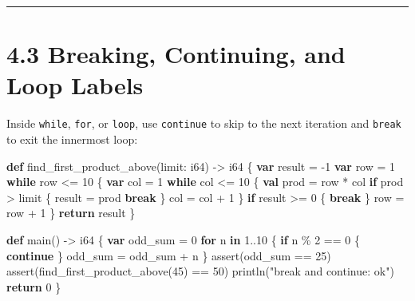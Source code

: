 \documentclass[
  english,
  oneside]{book}
\newenvironment{Shaded}{\begin{snugshade}}{\end{snugshade}}
\newcommand{\ControlFlowTok}[1]{\textcolor[rgb]{0.77,0.53,0.75}{\textbf{#1}}}
\newcommand{\DataTypeTok}[1]{\textcolor[rgb]{0.31,0.79,0.69}{#1}}
\newcommand{\DecValTok}[1]{\textcolor[rgb]{0.71,0.81,0.66}{#1}}
\newcommand{\FunctionTok}[1]{\textcolor[rgb]{0.86,0.86,0.67}{#1}}
\newcommand{\KeywordTok}[1]{\textcolor[rgb]{0.34,0.61,0.84}{\textbf{#1}}}
\newcommand{\NormalTok}[1]{\textcolor[rgb]{0.83,0.83,0.83}{#1}}
\newcommand{\OperatorTok}[1]{\textcolor[rgb]{0.83,0.83,0.83}{#1}}
\newcommand{\StringTok}[1]{\textcolor[rgb]{0.81,0.57,0.47}{#1}}
\begin{document}
\begin{center}\rule{0.5\linewidth}{0.5pt}\end{center}

\section{4.3 Breaking, Continuing, and Loop
Labels}\label{breaking-continuing-and-loop-labels}

Inside \texttt{while}, \texttt{for}, or \texttt{loop}, use
\texttt{continue} to skip to the next iteration and \texttt{break} to
exit the innermost loop:

\begin{Shaded}
\begin{Highlighting}[]
\KeywordTok{def}\NormalTok{ find\_first\_product\_above(limit: }\DataTypeTok{i64}\NormalTok{) }\OperatorTok{{-}\textgreater{}} \DataTypeTok{i64}\NormalTok{ \{}
    \KeywordTok{var} \DataTypeTok{result} \OperatorTok{=} \OperatorTok{{-}}\DecValTok{1}
    \KeywordTok{var}\NormalTok{ row }\OperatorTok{=} \DecValTok{1}
    \ControlFlowTok{while}\NormalTok{ row }\OperatorTok{\textless{}=} \DecValTok{10}\NormalTok{ \{}
        \KeywordTok{var}\NormalTok{ col }\OperatorTok{=} \DecValTok{1}
        \ControlFlowTok{while}\NormalTok{ col }\OperatorTok{\textless{}=} \DecValTok{10}\NormalTok{ \{}
            \KeywordTok{val}\NormalTok{ prod }\OperatorTok{=}\NormalTok{ row }\OperatorTok{*}\NormalTok{ col}
            \ControlFlowTok{if}\NormalTok{ prod }\OperatorTok{\textgreater{}}\NormalTok{ limit \{}
                \DataTypeTok{result} \OperatorTok{=}\NormalTok{ prod}
                \ControlFlowTok{break}
\NormalTok{            \}}
\NormalTok{            col }\OperatorTok{=}\NormalTok{ col }\OperatorTok{+} \DecValTok{1}
\NormalTok{        \}}
        \ControlFlowTok{if} \DataTypeTok{result} \OperatorTok{\textgreater{}=} \DecValTok{0}\NormalTok{ \{}
            \ControlFlowTok{break}
\NormalTok{        \}}
\NormalTok{        row }\OperatorTok{=}\NormalTok{ row }\OperatorTok{+} \DecValTok{1}
\NormalTok{    \}}
    \ControlFlowTok{return} \DataTypeTok{result}
\NormalTok{\}}

\KeywordTok{def}\NormalTok{ main() }\OperatorTok{{-}\textgreater{}} \DataTypeTok{i64}\NormalTok{ \{}
    \KeywordTok{var}\NormalTok{ odd\_sum }\OperatorTok{=} \DecValTok{0}
    \ControlFlowTok{for}\NormalTok{ n }\ControlFlowTok{in} \DecValTok{1}\OperatorTok{..}\DecValTok{10}\NormalTok{ \{}
        \ControlFlowTok{if}\NormalTok{ n }\OperatorTok{\%} \DecValTok{2} \OperatorTok{==} \DecValTok{0}\NormalTok{ \{}
            \ControlFlowTok{continue}
\NormalTok{        \}}
\NormalTok{        odd\_sum }\OperatorTok{=}\NormalTok{ odd\_sum }\OperatorTok{+}\NormalTok{ n}
\NormalTok{    \}}
    \FunctionTok{assert}\NormalTok{(odd\_sum }\OperatorTok{==} \DecValTok{25}\NormalTok{)}
    \FunctionTok{assert}\NormalTok{(find\_first\_product\_above(}\DecValTok{45}\NormalTok{) }\OperatorTok{==} \DecValTok{50}\NormalTok{)}
\NormalTok{    println(}\StringTok{"break and continue: ok"}\NormalTok{)}
    \ControlFlowTok{return} \DecValTok{0}
\NormalTok{\}}
\end{Highlighting}
\end{Shaded}
\end{document}
